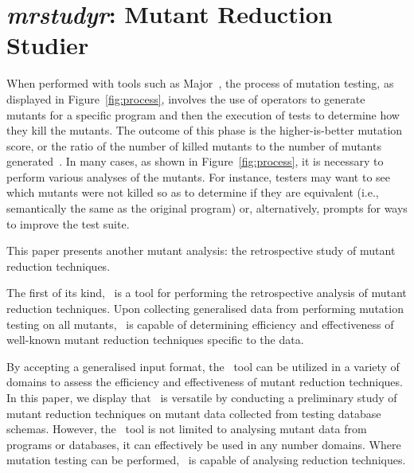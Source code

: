 
\section{\textit{mrstudyr}: Mutant Reduction Studier}





When performed with tools such as Major~\cite{Just2011b}, the process of mutation testing, as displayed in
Figure~\ref{fig:process}, involves the use of operators to generate mutants for a specific program and then the
execution of tests to determine how they kill the mutants. The outcome of this phase is the higher-is-better mutation
score, or the ratio of the number of killed mutants to the number of mutants generated~\cite{Just2011a}. In many cases,
as shown in Figure~\ref{fig:process}, it is necessary to perform various analyses of the mutants. For instance, testers
may want to see which mutants were not killed so as to determine if they are equivalent (i.e., semantically the same as
the original program) or, alternatively, prompts for ways to improve the  test suite.

This paper presents another mutant analysis: the retrospective study of mutant reduction techniques.

The first of its kind, \mr~is a tool for performing the retrospective analysis of mutant reduction techniques. Upon
collecting generalised data from performing mutation testing on all mutants, \mr~is capable of determining efficiency
and effectiveness of well-known mutant reduction techniques specific to the data.

By accepting a generalised input format, the \mr~tool can be utilized in a variety of domains to assess the efficiency
and effectiveness of mutant reduction techniques.  In this paper, we display that \mr~is versatile by conducting a
preliminary study of mutant reduction techniques on mutant data collected from testing database schemas.  However, the
\mr~tool is not limited to analysing mutant data from programs or databases, it can effectively be used in any number
domains. Where mutation testing can be performed, \mr~is capable of analysing reduction techniques.




